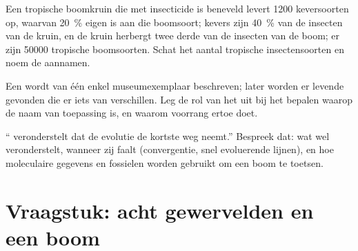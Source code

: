 \begin{exercise}[$\star\star\star$]\label{exo:b1:classifying-biodiversity:10}
Een tropische boomkruin die met insecticide is beneveld levert 1200
keversoorten op, waarvan \qty{20}{\%} eigen is aan die boomsoort; kevers zijn
\qty{40}{\%} van de insecten van de kruin, en de kruin herbergt twee derde
van de insecten van de boom; er zijn \num{50000} tropische boomsoorten. Schat
het aantal tropische insectensoorten en noem de aannamen.
\end{exercise}

\begin{exercise}[$\star\star\star$]\label{exo:b1:classifying-biodiversity:11}
Een  wordt van één enkel museumexemplaar beschreven; later worden er
levende  gevonden die er iets van verschillen. Leg de rol van het
 uit bij het bepalen waarop de naam van toepassing is, en waarom
voorrang ertoe doet.
\end{exercise}

\begin{exercise}[$\star\star\star$]\label{exo:b1:classifying-biodiversity:12}
`` veronderstelt dat de evolutie de kortste weg neemt.''
Bespreek dat: wat  wel veronderstelt, wanneer zij faalt
(convergentie, snel evoluerende lijnen), en hoe moleculaire gegevens en
fossielen worden gebruikt om een boom te toetsen.
\end{exercise}

\section{Vraagstuk: acht gewervelden en een boom}

